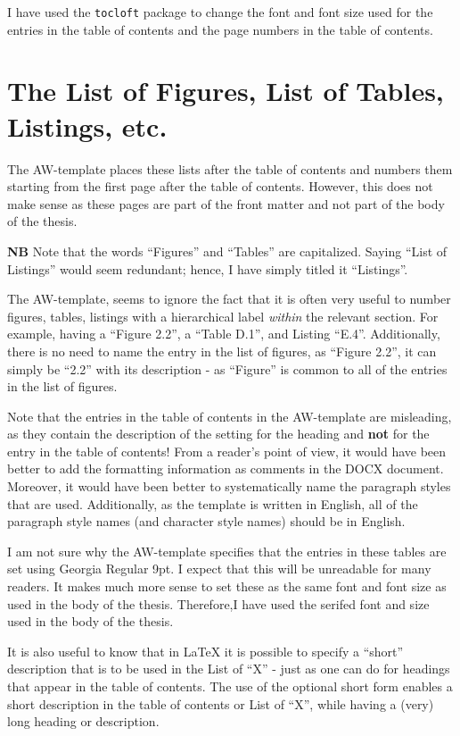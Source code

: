 \documentclass[12pt, twoside]{article}
\begin{document}
I have used the \texttt{tocloft} package to change the font and font size used for the entries in the table of contents and the page numbers in the table of contents.


\section{The List of Figures, List of Tables, Listings, etc.}

The AW-template places these lists after the table of contents and numbers them starting from the first page after the table of contents. However, this does not make sense as these pages are part of the front matter and not part of the body of the thesis.

\textbf{NB} Note that the words \enquote{Figures} and \enquote{Tables} are capitalized. Saying \enquote{List of Listings} would seem redundant; hence, I have simply titled it \enquote{Listings}.

The AW-template, seems to ignore the fact that it is often very useful to number figures, tables, listings with a hierarchical label \textit{within} the relevant section. For example, having a \enquote{Figure 2.2}, a \enquote{Table D.1}, and Listing \enquote{E.4}. Additionally, there is no need to name the entry in the list of figures, as \enquote{Figure 2.2}, it can simply be \enquote{2.2} with its description - as \enquote{Figure} is common to all of the entries in the list of figures.

Note that the entries in the table of contents in the AW-template are misleading, as they contain the description of the setting for the heading and \textbf{not} for the entry in the table of contents! From a reader's point of view, it would have been better to add the formatting information as comments in the \gls{DOCX} document. Moreover, it would have been better to systematically name the paragraph styles that are used. Additionally, as the template is written in English, all of the paragraph style names (and character style names) should be in English.

I am not sure why the AW-template specifies that the entries in these tables are set using Georgia Regular 9pt. I expect that this will be unreadable for many readers. It makes much more sense to set these as the same font and font size as used in the body of the thesis. Therefore,I have used the serifed font and size used in the body of the thesis.

It is also useful to know that in \LaTeX{} it is possible to specify a \enquote{short} description that is to be used in the List of \enquote{X} - just as one can do for headings that appear in the table of contents. The use of the optional short form enables a short description in the table of contents or List of \enquote{X}, while having a (very) long heading or description.
\end{document}
